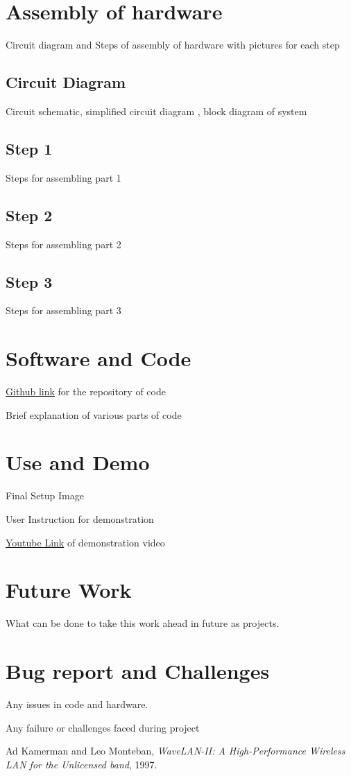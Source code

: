 \documentclass[a4paper,12pt,oneside]{book}
\begin{document}
\section{Assembly of hardware}
Circuit diagram and Steps of assembly of hardware with pictures for each step
\subsection*{Circuit Diagram}
Circuit schematic, simplified circuit diagram , block diagram of system
\subsection*{Step 1}
Steps for assembling part 1
\subsection*{Step 2}
Steps for assembling part 2
\subsection*{Step 3}
Steps for assembling part 3



\section{Software and Code}
\href{http://www.github.com}{Github link} for the repository of code

Brief explanation of various parts of code 

\section{Use and Demo}
Final Setup Image

User Instruction for demonstration

\href{http://www.youtube.com}{Youtube Link} of demonstration video 

\section{Future Work}
What can be done to take this work ahead in future as projects.

\section{Bug report and Challenges}
Any issues in code and hardware.

Any failure or challenges faced during project

\begin{thebibliography}{li}
Ad Kamerman and Leo Monteban,
{\em WaveLAN-II: A High-Performance Wireless LAN for the Unlicensed band},
1997.

\end{thebibliography}
\end{document}
